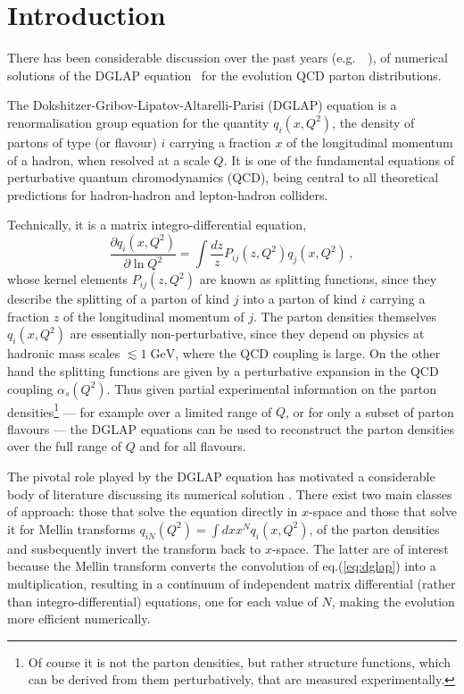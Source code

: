 \documentclass[12pt]{article}
\newcommand{\GeV}{\;\mathrm{GeV}}
\newcommand{\as}{\alpha_s}
\newcommand{\eg}{e.g.\ }
\newcommand{\AllDGLAP}{Botje,Schoeffel:1998tz,Pegasus,Pascaud:2001bi,Weinzierl:2002mv,coriano,GuzziThesis}
\begin{document}
\section{Introduction}
\label{sec:intro}

There has been considerable discussion over the past years
(\eg~\cite{\AllDGLAP}),
of numerical solutions of the DGLAP equation~\cite{DGLAP} for the
evolution QCD parton distributions.


The Dokshitzer-Gribov-Lipatov-Altarelli-Parisi (DGLAP) equation
\cite{DGLAP} is a renormalisation group equation for the quantity
$q_i(x,Q^2)$, the density of partons of type (or flavour) $i$ carrying
a fraction $x$ of the longitudinal momentum of a hadron, when resolved
at a scale $Q$. It is one of the fundamental equations of perturbative
quantum chromodynamics (QCD), being central to all theoretical
predictions for hadron-hadron and lepton-hadron colliders.

Technically, it is a matrix integro-differential equation,
\begin{equation}
  \label{eq:dglap}
  \frac{\partial q_i(x,Q^2)}{\partial \ln Q^2} = \int \frac{dz}{z}
  P_{ij}(z,Q^2) q_j(x,Q^2)\,,
\end{equation}
whose kernel elements $P_{ij}(z,Q^2)$ are known as splitting
functions, since they describe the splitting of a parton of kind $j$
into a parton of kind $i$ carrying a fraction $z$ of the longitudinal
momentum of $j$. The parton densities themselves $q_i(x,Q^2)$ are
essentially non-perturbative, since they depend on physics at hadronic
mass scales $\lesssim 1 \GeV$, where the QCD coupling is large. On the
other hand the splitting functions are given by a perturbative
expansion in the QCD coupling $\as(Q^2)$. Thus given partial
experimental information on the parton densities\footnote{Of course it
  is not the parton densities, but rather structure functions, which
  can be derived from them perturbatively, that are measured
  experimentally.} %
--- for example over a limited range of $Q$, or for only a subset of
parton flavours --- the DGLAP equations can be used to reconstruct the
parton densities over the full range of $Q$ and for all flavours.

The pivotal role played by the DGLAP equation has motivated a
considerable body of literature discussing its numerical solution
\cite{\AllDGLAP}. There exist two main classes of approach: those that
solve the equation directly in $x$-space and those that solve it for
Mellin transforms $q_{iN}(Q^2) = \int dx x^N q_i(x,Q^2)$, of the
parton densities and susbequently invert the transform back to
$x$-space. The latter are of interest because the Mellin transform
converts the convolution of eq.(\ref{eq:dglap}) into a multiplication,
resulting in a continuum of independent matrix differential (rather
than integro-differential) equations, one for each value of $N$,
making the evolution more efficient numerically. 
\end{document}
